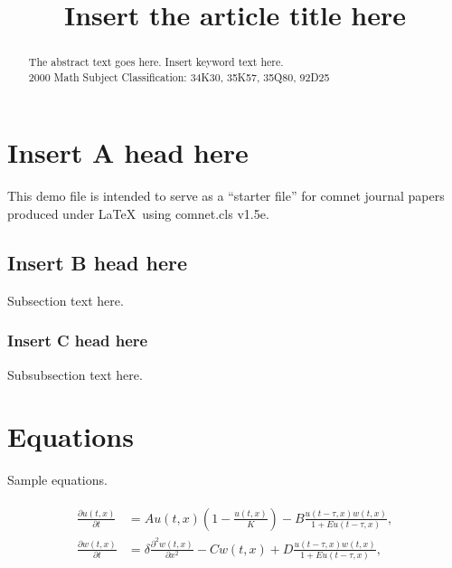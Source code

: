 \documentclass{comnet}%
\begin{document}
\title{Insert the article title here}


\author{%
\address{Insert First author address}
\address{Insert second author address}
\and
\address{Third author address}}

\maketitle

\begin{abstract}
{The abstract text goes here.}
{Insert keyword text here.}
\\
2000 Math Subject Classification: 34K30, 35K57, 35Q80,  92D25
\end{abstract}


\section{Insert A head here}
This demo file is intended to serve as a ``starter file''
for comnet journal papers produced under \LaTeX\ using
comnet.cls v1.5e.

\subsection{Insert B head here}
Subsection text here.


\subsubsection{Insert C head here}
Subsubsection text here.

\section{Equations}

Sample equations.

\begin{align}\label{1.1}
\begin{split}
\frac{\partial u(t,x)}{\partial t} &= Au(t,x) \left(1-\frac{u(t,x)}{K}\right)-B\frac{u(t-\tau,x) w(t,x)}{1+Eu(t-\tau,x)},\\
\frac{\partial w(t,x)}{\partial t} &=\delta \frac{\partial^2w(t,x)}{\partial x^2}-Cw(t,x)+D\frac{u(t-\tau,x)w(t,x)}{1+Eu(t-\tau,x)},
\end{split}
\end{align}
\end{document}
